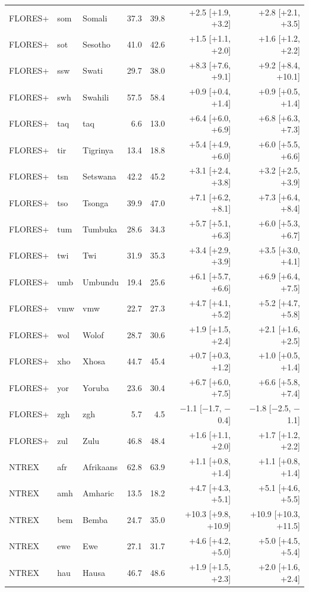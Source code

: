 {\begin{longtable}{@{}lllrrrr@{}}
FLORES+ & som & Somali & 37.3 & 39.8 & +2.5 [+1.9, +3.2] & +2.8 [+2.1, +3.5] \\
FLORES+ & sot & Sesotho & 41.0 & 42.6 & +1.5 [+1.1, +2.0] & +1.6 [+1.2, +2.2] \\
FLORES+ & ssw & Swati & 29.7 & 38.0 & +8.3 [+7.6, +9.1] & +9.2 [+8.4, +10.1] \\
FLORES+ & swh & Swahili & 57.5 & 58.4 & +0.9 [+0.4, +1.4] & +0.9 [+0.5, +1.4] \\
FLORES+ & taq & taq & 6.6 & 13.0 & +6.4 [+6.0, +6.9] & +6.8 [+6.3, +7.3] \\
FLORES+ & tir & Tigrinya & 13.4 & 18.8 & +5.4 [+4.9, +6.0] & +6.0 [+5.5, +6.6] \\
FLORES+ & tsn & Setswana & 42.2 & 45.2 & +3.1 [+2.4, +3.8] & +3.2 [+2.5, +3.9] \\
FLORES+ & tso & Tsonga & 39.9 & 47.0 & +7.1 [+6.2, +8.1] & +7.3 [+6.4, +8.4] \\
FLORES+ & tum & Tumbuka & 28.6 & 34.3 & +5.7 [+5.1, +6.3] & +6.0 [+5.3, +6.7] \\
FLORES+ & twi & Twi & 31.9 & 35.3 & +3.4 [+2.9, +3.9] & +3.5 [+3.0, +4.1] \\
FLORES+ & umb & Umbundu & 19.4 & 25.6 & +6.1 [+5.7, +6.6] & +6.9 [+6.4, +7.5] \\
FLORES+ & vmw & vmw & 22.7 & 27.3 & +4.7 [+4.1, +5.2] & +5.2 [+4.7, +5.8] \\
FLORES+ & wol & Wolof & 28.7 & 30.6 & +1.9 [+1.5, +2.4] & +2.1 [+1.6, +2.5] \\
FLORES+ & xho & Xhosa & 44.7 & 45.4 & +0.7 [+0.3, +1.2] & +1.0 [+0.5, +1.4] \\
FLORES+ & yor & Yoruba & 23.6 & 30.4 & +6.7 [+6.0, +7.5] & +6.6 [+5.8, +7.4] \\
FLORES+ & zgh & zgh & 5.7 & 4.5 & $-$1.1 [$-$1.7, $-$0.4] & $-$1.8 [$-$2.5, $-$1.1] \\
FLORES+ & zul & Zulu & 46.8 & 48.4 & +1.6 [+1.1, +2.0] & +1.7 [+1.2, +2.2] \\
NTREX & afr & Afrikaans & 62.8 & 63.9 & +1.1 [+0.8, +1.4] & +1.1 [+0.8, +1.4] \\
NTREX & amh & Amharic & 13.5 & 18.2 & +4.7 [+4.3, +5.1] & +5.1 [+4.6, +5.5] \\
NTREX & bem & Bemba & 24.7 & 35.0 & +10.3 [+9.8, +10.9] & +10.9 [+10.3, +11.5] \\
NTREX & ewe & Ewe & 27.1 & 31.7 & +4.6 [+4.2, +5.0] & +5.0 [+4.5, +5.4] \\
NTREX & hau & Hausa & 46.7 & 48.6 & +1.9 [+1.5, +2.3] & +2.0 [+1.6, +2.4] \\

\end{longtable}}

